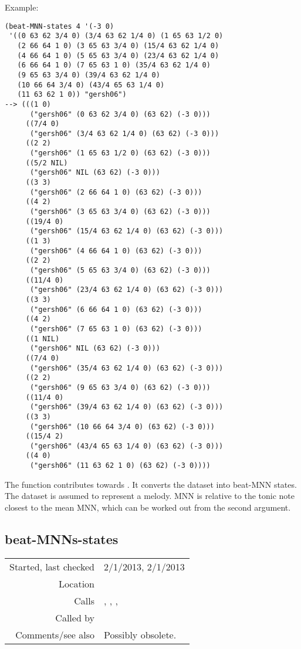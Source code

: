\vspace{0.5cm}
\noindent Example:
\begin{verbatim}
(beat-MNN-states 4 '(-3 0)
 '((0 63 62 3/4 0) (3/4 63 62 1/4 0) (1 65 63 1/2 0)
   (2 66 64 1 0) (3 65 63 3/4 0) (15/4 63 62 1/4 0)
   (4 66 64 1 0) (5 65 63 3/4 0) (23/4 63 62 1/4 0)
   (6 66 64 1 0) (7 65 63 1 0) (35/4 63 62 1/4 0)
   (9 65 63 3/4 0) (39/4 63 62 1/4 0)
   (10 66 64 3/4 0) (43/4 65 63 1/4 0)
   (11 63 62 1 0)) "gersh06")
--> (((1 0)
      ("gersh06" (0 63 62 3/4 0) (63 62) (-3 0)))
     ((7/4 0)
      ("gersh06" (3/4 63 62 1/4 0) (63 62) (-3 0)))
     ((2 2)
      ("gersh06" (1 65 63 1/2 0) (63 62) (-3 0)))
     ((5/2 NIL)
      ("gersh06" NIL (63 62) (-3 0)))
     ((3 3)
      ("gersh06" (2 66 64 1 0) (63 62) (-3 0)))
     ((4 2)
      ("gersh06" (3 65 63 3/4 0) (63 62) (-3 0)))
     ((19/4 0)
      ("gersh06" (15/4 63 62 1/4 0) (63 62) (-3 0)))
     ((1 3)
      ("gersh06" (4 66 64 1 0) (63 62) (-3 0)))
     ((2 2)
      ("gersh06" (5 65 63 3/4 0) (63 62) (-3 0)))
     ((11/4 0)
      ("gersh06" (23/4 63 62 1/4 0) (63 62) (-3 0)))
     ((3 3)
      ("gersh06" (6 66 64 1 0) (63 62) (-3 0)))
     ((4 2)
      ("gersh06" (7 65 63 1 0) (63 62) (-3 0)))
     ((1 NIL)
      ("gersh06" NIL (63 62) (-3 0)))
     ((7/4 0)
      ("gersh06" (35/4 63 62 1/4 0) (63 62) (-3 0)))
     ((2 2)
      ("gersh06" (9 65 63 3/4 0) (63 62) (-3 0)))
     ((11/4 0)
      ("gersh06" (39/4 63 62 1/4 0) (63 62) (-3 0)))
     ((3 3)
      ("gersh06" (10 66 64 3/4 0) (63 62) (-3 0)))
     ((15/4 2)
      ("gersh06" (43/4 65 63 1/4 0) (63 62) (-3 0)))
     ((4 0)
      ("gersh06" (11 63 62 1 0) (63 62) (-3 0))))
\end{verbatim}

\noindent The function contributes towards
\cite{collins2012}. It converts the dataset into
beat-MNN states. The dataset is assumed to represent
a melody. MNN is relative to the tonic note closest
to the mean MNN, which can be worked out from the
second argument.


\subsection*{beat-MNNs-states}\label{fun:beat-MNNs-states}

\vspace{0.3cm}
\begin{tabular}{r|p{8cm}}
Started, last checked & 2/1/2013, 2/1/2013 \\
Location & \nameref{sec:beat-rel-MNN-states} \\
Calls & \nameref{fun:centre-dataset}, \nameref{fun:fifths-step-mode2MNN-MPN} , \nameref{fun:nth-list-of-lists}, \nameref{fun:segments-strict} \\
Called by & \\
Comments/see also & Possibly obsolete.
\end{tabular}

